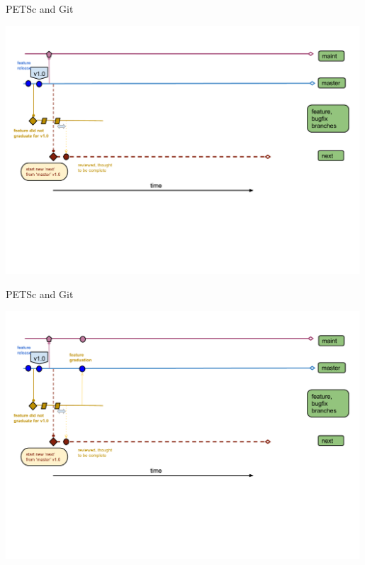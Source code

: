 \begin{frame}{PETSc and Git}
  \begin{center}
    \includegraphics[width=0.99\textwidth]{figures/gitworkflows-58}
  \end{center}
\end{frame}

\begin{frame}{PETSc and Git}
  \begin{center}
    \includegraphics[width=0.99\textwidth]{figures/gitworkflows-60}
  \end{center}
\end{frame}

